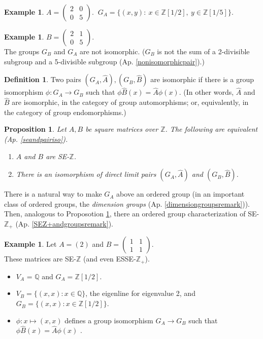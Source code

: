 \documentclass{amsart}
\newcommand{\si}{\index}
\newtheorem{prop}[equation]{Proposition}
\theoremstyle{definition}
\newtheorem{de}[equation]{Definition}
\newtheorem{ex}[equation]{Example}
\theoremstyle{definition}
\newcommand{\apr}{(Ap. \ref}
\newcommand{\Z}{\mathbb Z}
\newcommand{\Q}{\mathbb Q}
\numberwithin{equation}{subsection}
\begin{document}
\begin{ex}
   $A= \begin{pmatrix} 2 & 0\\ 0& 5 \end{pmatrix}$.
   $\ G_A = \{ (x,y): \ x\in \Z[1/2], \ y\in \Z[1/5] \} $.
   \end{ex}
\begin{ex}
   $B= \begin{pmatrix} 2 & 1\\ 0 &5 \end{pmatrix}$.  \\
The groups    $G_B$ and $G_A$ are not isomorphic.
($G_B$ is not the sum of a 2-divisible subgroup and a 5-divisible subgroup
 \apr{nonisomorphicpair}).) \end{ex}
\begin{de}  Two pairs $(G_A,\hat A), (G_B, \hat B)$ are isomorphic
if there is a group isomorphism $\phi : G_A \to G_B$ such that
$ \phi \hat B (x) =  \hat A \phi (x)$.
(In other words, $\hat A$ and $\hat B$ are isomorphic, in the
category of group automorphisms; or, equivalently, in the
category of group endomorphisms.)
\end{de}
\begin{prop}\label{prop:sezdirectlimit}  Let $A,B$ be square matrices over $\Z$.
   The following are equivalent \apr{seandpairiso}).
\begin{enumerate}
\item  $A$ and $B$ are SE-$\Z$.
\item  There is an isomorphism of direct limit pairs $(G_A, \hat A)$
   and $(G_B, \hat B)$.
   \end{enumerate}
\end{prop}

There is a natural way to make
$G_A$ above an ordered group
(in an important class of ordered groups,
the {\it dimension groups}\si{dimension group} \apr{dimensiongroupsremark})).
Then,
analogous to Proposotion \ref{prop:sezdirectlimit},
there an ordered group characterization
of SE-$\Z_+$ \apr{SEZ+andgroupsremark}).



\begin{ex}
      Let $A = (2)$ and $B=\begin{pmatrix} 1&1 \\ 1&1 \end{pmatrix}$. \\
These matrices are  SE-$\Z$ (and even ESSE-$\Z_+$).
\begin{itemize}
\item
$V_A$ = $\Q$ and
$G_A= \Z[1/2]$.
\item
$V_B = \{ (x,x): x\in \Q\}$, the eigenline for eigenvalue 2, and
$G_B  = \{ (x,x): x\in \Z[1/2] \}$.
\item
$\phi \colon x\mapsto (x,x)$ defines a group isomorphism $G_A \to G_B$
such that $\phi\hat B  (x) =  \hat A \phi(x)$ .
\end{itemize}
\end{ex}
\end{document}
